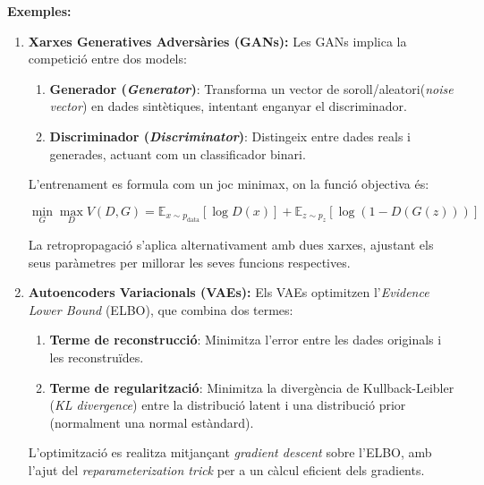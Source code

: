\begin{enumerate}
 \textbf{Exemples:}

     \begin{enumerate}

      \item \textbf{Xarxes Generatives Adversàries (GANs):} Les GANs implica la competició entre dos models:

          \begin{enumerate}

           \item \textbf{Generador (\textit{Generator})}: Transforma un vector de soroll/aleatori(\textit{noise vector}) en dades sintètiques, intentant enganyar el discriminador.

           \item \textbf{Discriminador (\textit{Discriminator})}: Distingeix entre dades reals i generades, actuant com un classificador binari.

          \end{enumerate}

           L'entrenament es formula com un joc minimax, on la funció objectiva és:

           $$ \min_G \max_D V(D, G) = \mathbb{E}_{x \sim p_{\text{data}}}[\log D(x)] + \mathbb{E}_{z \sim p_z}[\log(1 - D(G(z)))] $$

           La retropropagació s'aplica alternativament amb dues xarxes, ajustant els seus paràmetres per millorar les seves funcions respectives.

           \item \textbf{Autoencoders Variacionals (VAEs):} Els VAEs optimitzen l'\textit{Evidence Lower Bound} (ELBO), que combina dos termes:

               \begin{enumerate}

                \item \textbf{Terme de reconstrucció}: Minimitza l'error entre les dades originals i les reconstruïdes.

                \item \textbf{Terme de regularització}: Minimitza la divergència de Kullback-Leibler (\textit{KL divergence}) entre la distribució latent i una distribució prior (normalment una normal estàndard).

               \end{enumerate}

            L'optimització es realitza mitjançant \textit{gradient descent} sobre l'ELBO, amb l'ajut del \textit{reparameterization trick} per a un càlcul eficient dels gradients.


\end{enumerate}
\end{enumerate}
